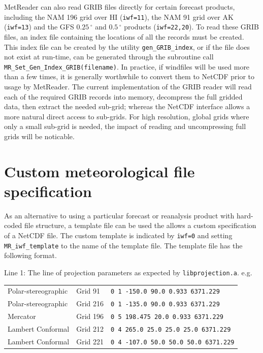 \documentclass[11pt]{article}   %
\begin{document}
MetReader can also read GRIB files directly for certain forecast products, including the
NAM 196 grid over HI (\texttt{iwf=11}), the NAM 91 grid over AK
(\texttt{iwf=13}) and the GFS $0.25 \, ^{\circ}$ and $0.5 \, ^{\circ}$
products (\texttt{iwf=22,20}).  To read these GRIB files, an index
file containing the locations of all the records must be created.
This index file can be created 
by the utility \texttt{gen\_GRIB\_index}, or if the file does not exist at
run-time, can be generated through the subroutine call
\texttt{MR\_Set\_Gen\_Index\_GRIB(filename)}.  In practice, if windfiles will be used
more than a few times, it is generally worthwhile to convert them to NetCDF prior
to usage by MetReader.  The current
implementation of the GRIB reader will read each of the required GRIB records into
memory, decompress the full gridded data, then extract the needed sub-grid; whereas the 
NetCDF interface allows a more natural direct access to sub-grids.  For high resolution,
global grids where only a small sub-grid is needed, the impact of reading and uncompressing
full grids will be noticable.

\section{Custom meteorological file specification}\label{SecCust}
As an alternative to using a particular forecast or reanalysis product with
hard-coded file structure, a template file can be used the allows a custom
specification of a NetCDF file.
The custom template is indicated by \texttt{iwf=0} and setting \texttt{MR\_iwf\_template}
to the name of the template file.  The template file has the following format.

Line 1: The line of projection parameters as expected by \texttt{libprojection.a}.
e.g.
\\
\begin{tabular}{ l  l  l }
Polar-stereographic & Grid 91  & \verb|0 1 -150.0 90.0 0.933 6371.229| \\
Polar-stereographic & Grid 216 & \verb|0 1 -135.0 90.0 0.933 6371.229| \\
Mercator            & Grid 196 & \verb|0 5 198.475 20.0 0.933 6371.229| \\
Lambert Conformal   & Grid 212 & \verb|0 4 265.0 25.0 25.0 25.0 6371.229| \\
Lambert Conformal   & Grid 221 & \verb|0 4 -107.0 50.0 50.0 50.0 6371.229| \\
\end{tabular}
\end{document}

